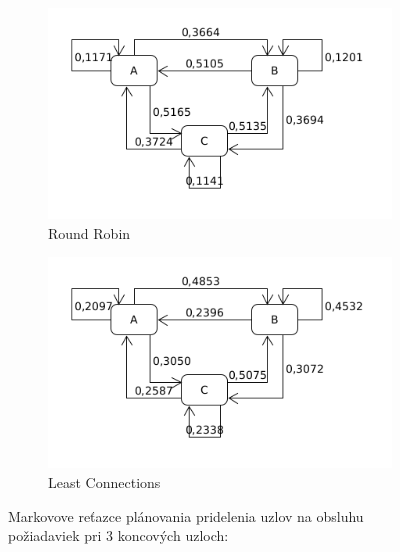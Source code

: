 \documentclass[12pt, a4paper]{article}
\begin{document}
\begin{figure}[h!]
	\centering
	\begin{subfigure}[t]{.48\textwidth}
  		\centering
  		\includegraphics[width=\textwidth]{images/10000-3-RR.png}
  		\caption{Round Robin}
	\end{subfigure}
	\begin{subfigure}[t]{.48\textwidth}
  		\centering
  		\includegraphics[width=\textwidth]{images/10000-3-LC.png}
  		\caption{Least Connections}
	\end{subfigure}
	\caption{Markovove reťazce plánovania pridelenia uzlov na obsluhu požiadaviek
	pri 3 koncových uzloch: \usebox{\shield}
	}
\end{figure}
\end{document}
